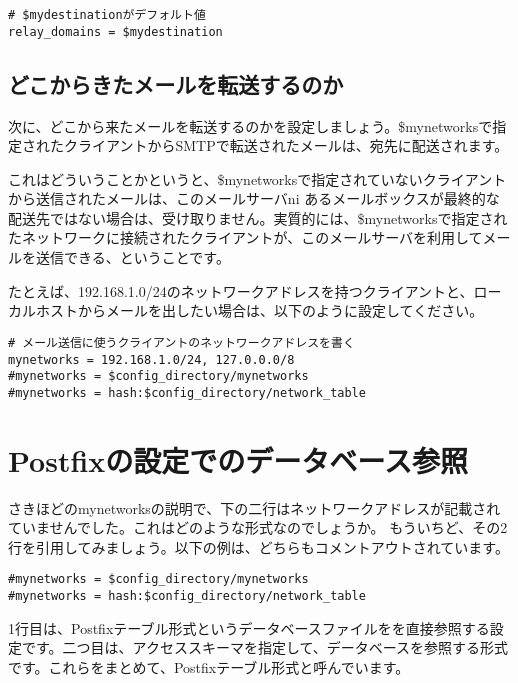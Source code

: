 \begin{lstlisting}[basicstyle=\ttfamily\footnotesize, frame=single]
# $mydestinationがデフォルト値
relay_domains = $mydestination
\end{lstlisting}


\subsection{どこからきたメールを転送するのか}
次に、どこから来たメールを転送するのかを設定しましょう。\$mynetworksで指定されたクライアントからSMTPで転送されたメールは、宛先に配送されます。

これはどういうことかというと、\$mynetworksで指定されていないクライアントから送信されたメールは、このメールサーバni
あるメールボックスが最終的な配送先ではない場合は、受け取りません。実質的には、\$mynetworksで指定されたネットワークに接続されたクライアントが、このメールサーバを利用してメールを送信できる、ということです。

たとえば、192.168.1.0/24のネットワークアドレスを持つクライアントと、ローカルホストからメールを出したい場合は、以下のように設定してください。

\begin{lstlisting}[basicstyle=\ttfamily\footnotesize, frame=single]
# メール送信に使うクライアントのネットワークアドレスを書く
mynetworks = 192.168.1.0/24, 127.0.0.0/8
#mynetworks = $config_directory/mynetworks
#mynetworks = hash:$config_directory/network_table
\end{lstlisting}

\section{Postfixの設定でのデータベース参照}
さきほどのmynetworksの説明で、下の二行はネットワークアドレスが記載されていませんでした。これはどのような形式なのでしょうか。
もういちど、その2行を引用してみましょう。以下の例は、どちらもコメントアウトされています。

\begin{lstlisting}[basicstyle=\ttfamily\footnotesize, frame=single]
#mynetworks = $config_directory/mynetworks
#mynetworks = hash:$config_directory/network_table
\end{lstlisting}

1行目は、Postfixテーブル形式というデータベースファイルをを直接参照する設定です。二つ目は、アクセススキーマを指定して、データベースを参照する形式です。これらをまとめて、Postfixテーブル形式と呼んでいます。


